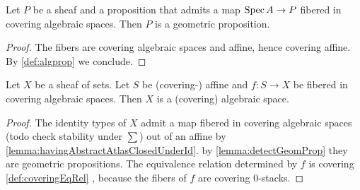 \begin{lemma}{\label{lemma:detectGeomProp}}
	Let $P$ be a sheaf and a proposition that admits a map $\operatorname{Spec} A \to P$ fibered in covering algebraic spaces. Then $P$ is a geometric proposition.
\end{lemma}
\begin{proof}
	The fibers are covering algebraic spaces and affine, hence covering affine. By \ref{def:algprop} we conclude.
\end{proof}
\begin{theorem}
	Let $X$ be a sheaf of sets. Let $S$ be (covering-) affine and $f : S \to X$ be fibered in covering algebraic spaces. Then $X$ is a (covering) algebraic space.
\end{theorem}
\begin{proof}
	The identity types of $X$ admit a map fibered in covering algebraic spaces (todo check stability under $\sum$) out of an affine by \ref{lemma:havingAbstractAtlasClosedUnderId}. by \ref{lemma:detectGeomProp} they are geometric propositions. The equivalence relation determined by $f$ is covering \ref{def:coveringEqRel} , because the fibers of $f$ are covering 0-stacks.
\end{proof}
